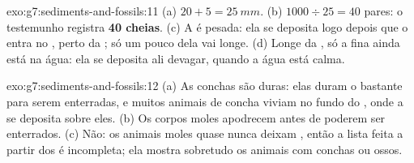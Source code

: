 \begin{solution}{exo:g7:sediments-and-fossils:11}
(a) $20 + 5 = \qty{25}{mm}$. (b) $1000 \div 25 = 40$ pares: o testemunho
registra \textbf{40 cheias}. (c) A  é pesada: ela se deposita logo
depois que o  entra no , perto da ; só um pouco dela vai longe.
(d) Longe da , só a  fina ainda está na água: ela se deposita ali
devagar, quando a água está calma.
\end{solution}

\begin{solution}{exo:g7:sediments-and-fossils:12}
(a) As conchas são duras: elas duram o bastante para serem enterradas, e
muitos animais de concha viviam no fundo do , onde a  se deposita
sobre eles. (b) Os corpos moles apodrecem antes de poderem ser
enterrados. (c) Não: os animais moles quase nunca deixam , então a
lista feita a partir dos  é incompleta; ela mostra sobretudo os
animais com conchas ou ossos.
\end{solution}


